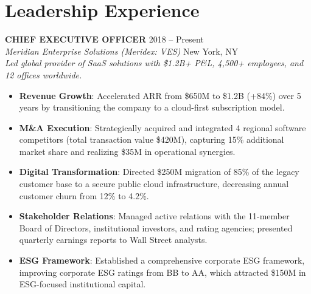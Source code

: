 \documentclass[10pt,letterpaper]{article}
\begin{document}
\section*{Leadership Experience}

\noindent
\textbf{\large\color{primaryColor} CHIEF EXECUTIVE OFFICER} \hfill {\color{subtleColor}\small 2018 -- Present} \\
\textit{Meridian Enterprise Solutions (Meridex: VES)} \hfill {\color{subtleColor}\small New York, NY} \\
\vspace{3pt}
{\color{textColor}\small\textit{Led global provider of SaaS solutions with \$1.2B+ P\&L, 4,500+ employees, and 12 offices worldwide.}}
\begin{itemize}
    \item \textbf{Revenue Growth}: Accelerated ARR from \$650M to \$1.2B (+84\%) over 5 years by transitioning the company to a cloud-first subscription model.
    \item \textbf{M\&A Execution}: Strategically acquired and integrated 4 regional software competitors (total transaction value \$420M), capturing 15\% additional market share and realizing \$35M in operational synergies.
    \item \textbf{Digital Transformation}: Directed \$250M migration of 85\% of the legacy customer base to a secure public cloud infrastructure, decreasing annual customer churn from 12\% to 4.2\%.
    \item \textbf{Stakeholder Relations}: Managed active relations with the 11-member Board of Directors, institutional investors, and rating agencies; presented quarterly earnings reports to Wall Street analysts.
    \item \textbf{ESG Framework}: Established a comprehensive corporate ESG framework, improving corporate ESG ratings from BB to AA, which attracted \$150M in ESG-focused institutional capital.
\end{itemize}

\vspace{12pt}
\end{document}
